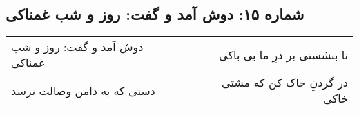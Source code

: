 \begin{center}
\section*{شماره ۱۵: دوش آمد و گفت: روز و شب غمناکی}
\label{sec:015}
\begin{longtable}{l p{0.5cm} r}
دوش آمد و گفت: روز و شب غمناکی
&&
تا بنشستی بر درِ ما بی باکی
\\
دستی که به دامن وصالت نرسد
&&
در گردنِ خاک کن که مشتی خاکی
\\
\end{longtable}
\end{center}
